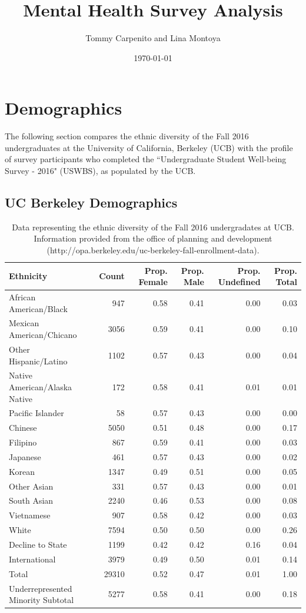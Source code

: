 \documentclass{article}\usepackage[]{graphicx}\usepackage[]{color}
\title{Mental Health Survey Analysis}
\author{Tommy Carpenito and Lina Montoya}
\date{\today}
\begin{document}
\maketitle
\tableofcontents

\pagebreak

\section{Demographics}
The following section compares the ethnic diversity of the Fall 2016 undergraduates at the University of California, Berkeley (UCB) with the profile of survey participants who completed the ``Undergraduate Student Well-being Survey - 2016" (USWBS), as populated by the UCB.
\subsection{UC Berkeley Demographics}

\begin{table}[ht]
\centering
\begin{tabular}{lrrrrr}
  \hline
Ethnicity & Count & Prop. Female & Prop. Male & Prop. Undefined & Prop. Total \\ 
  \hline
African American/Black & 947 & 0.58 & 0.41 & 0.00 & 0.03 \\ 
  Mexican American/Chicano & 3056 & 0.59 & 0.41 & 0.00 & 0.10 \\ 
  Other Hispanic/Latino & 1102 & 0.57 & 0.43 & 0.00 & 0.04 \\ 
  Native American/Alaska Native & 172 & 0.58 & 0.41 & 0.01 & 0.01 \\ 
  Pacific Islander &  58 & 0.57 & 0.43 & 0.00 & 0.00 \\ 
  Chinese & 5050 & 0.51 & 0.48 & 0.00 & 0.17 \\ 
  Filipino & 867 & 0.59 & 0.41 & 0.00 & 0.03 \\ 
  Japanese & 461 & 0.57 & 0.43 & 0.00 & 0.02 \\ 
  Korean & 1347 & 0.49 & 0.51 & 0.00 & 0.05 \\ 
  Other Asian & 331 & 0.57 & 0.43 & 0.00 & 0.01 \\ 
  South Asian & 2240 & 0.46 & 0.53 & 0.00 & 0.08 \\ 
  Vietnamese & 907 & 0.58 & 0.42 & 0.00 & 0.03 \\ 
  White & 7594 & 0.50 & 0.50 & 0.00 & 0.26 \\ 
  Decline to State & 1199 & 0.42 & 0.42 & 0.16 & 0.04 \\ 
  International & 3979 & 0.49 & 0.50 & 0.01 & 0.14 \\ 
  Total & 29310 & 0.52 & 0.47 & 0.01 & 1.00 \\ 
  Underrepresented Minority Subtotal & 5277 & 0.58 & 0.41 & 0.00 & 0.18 \\ 
   \hline
\end{tabular}
\caption{Data representing the ethnic diversity of the Fall 2016 undergradates at UCB. Information provided from the office of planning and development  (http://opa.berkeley.edu/uc-berkeley-fall-enrollment-data).} 
\end{table}
\end{document}
